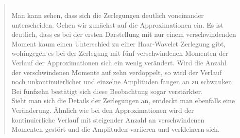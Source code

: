 \begin{quote}
\begin{center}
\begin{tabular}{ll}
                \end{tabular}
                \end{center}
                
                \vspace{2em}
                
            Man kann sehen, dass sich die Zerlegungen deutlich voneinander
            unterscheiden. Gehen wir zunächst auf die Approximationen ein. Es
            ist deutlich, dass es bei der ersten Darstellung mit nur einem
            verschwindenden Moment kaum einen Unterschied zu einer
            Haar-Wavelet Zerlegung gibt, wohingegen es bei der Zerlegung mit
            fünf verschwindenen Momenten der Verlauf der Approximationen sich
            ein wenig verändert. Wird die Anzahl der verschwindenen Momente auf
            zehn verdoppelt, so wird der Verlauf noch unkontinuierlicher und
            einzelne Amplituden fangen an zu schwanken. Bei fünfzehn bestätigt
            sich diese Beobachtung sogar verstärkter.\\
            Sieht man sich die Details der Zerlegungen an, entdeckt man
            ebenfalls eine Veränderung. Ähnlich wie bei den Approximationen wird
            der kontinuierliche Verlauf mit steigender Anzahl an verschwindenen
            Momenten gestört und die Amplituden variieren und verkleinern sich.
                
                
        \end{quote}%
        
        
